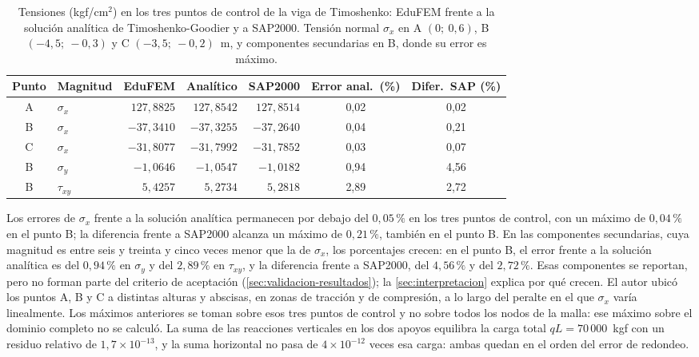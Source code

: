 \begin{table}[htbp]
\centering
\caption[Tensiones (kgf/cm$^2$) en los puntos de control de la viga de Timoshenko: EduFEM frente a la solución analítica y a SAP2000.]{Tensiones (kgf/cm$^2$) en los tres puntos de control de la viga de Timoshenko: EduFEM frente a la solución analítica de Timoshenko-Goodier y a SAP2000. Tensión normal $\sigma_x$ en A $(0;\ 0{,}6)$, B $(-4{,}5;\ -0{,}3)$ y C $(-3{,}5;\ -0{,}2)$~m, y componentes secundarias en B, donde su error es máximo.}
\label{tab:timoshenko-stress}
\small
\setlength{\tabcolsep}{4pt}
\begin{tabular}{c l r r r c c}
\hline
Punto & Magnitud & EduFEM & Analítico & SAP2000 & Error anal.\ (\%) & Difer.\ SAP (\%) \\
\hline
A & $\sigma_x$   & $127{,}8825$ & $127{,}8542$ & $127{,}8514$ & 0,02 & 0,02 \\
B & $\sigma_x$   & $-37{,}3410$ & $-37{,}3255$ & $-37{,}2640$ & 0,04 & 0,21 \\
C & $\sigma_x$   & $-31{,}8077$ & $-31{,}7992$ & $-31{,}7852$ & 0,03 & 0,07 \\
B & $\sigma_y$   & $-1{,}0646$  & $-1{,}0547$  & $-1{,}0182$  & 0,94   & 4,56 \\
B & $\tau_{xy}$  & $5{,}4257$   & $5{,}2734$   & $5{,}2818$   & 2,89   & 2,72 \\
\hline
\end{tabular}
{\singlespacing{}}
\end{table}

Los errores de $\sigma_x$ frente a la solución analítica permanecen por debajo del $0{,}05\,\%$ en los tres puntos de control, con un máximo de $0{,}04\,\%$ en el punto B; la diferencia frente a SAP2000 alcanza un máximo de $0{,}21\,\%$, también en el punto B. En las componentes secundarias, cuya magnitud es entre seis y treinta y cinco veces menor que la de $\sigma_x$, los porcentajes crecen: en el punto B, el error frente a la solución analítica es del $0{,}94\,\%$ en $\sigma_y$ y del $2{,}89\,\%$ en $\tau_{xy}$, y la diferencia frente a SAP2000, del $4{,}56\,\%$ y del $2{,}72\,\%$. Esas componentes se reportan, pero no forman parte del criterio de aceptación (\autoref{sec:validacion-resultados}); la \autoref{sec:interpretacion} explica por qué crecen. El autor ubicó los puntos A, B y C a distintas alturas y abscisas, en zonas de tracción y de compresión, a lo largo del peralte en el que $\sigma_x$ varía linealmente. Los máximos anteriores se toman sobre esos tres puntos de control y no sobre todos los nodos de la malla: ese máximo sobre el dominio completo no se calculó. La suma de las reacciones verticales en los dos apoyos equilibra la carga total $qL = 70\,000$~kgf con un residuo relativo de $1{,}7\times10^{-13}$, y la suma horizontal no pasa de $4\times10^{-12}$ veces esa carga: ambas quedan en el orden del error de redondeo.

